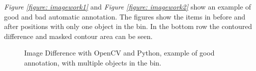 \textit{Figure \ref{figure: imagework1}} and \textit{Figure \ref{figure: imagework2}} show an example of good and bad automatic annotation. The figures show the items in before and after positions with only one object in the bin. In the bottom row the contoured difference and masked contour area can be seen. 
\clearpage
\begin{figure}[ht]
 \centering
 \hspace{0.5cm}
 \hspace{0.5cm}
 \hspace{0.5cm}
 \caption{Image Difference with OpenCV and Python, example of good annotation, with multiple objects in the bin.}
 \label{figure: multiimagework1}
\end{figure}

